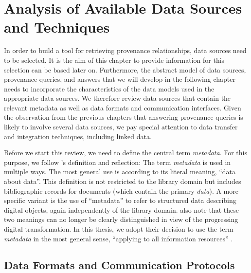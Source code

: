 \chapter{Analysis of Available Data Sources and Techniques}
\label{chap:analysis}

In order to build a tool for retrieving provenance relationships,
data sources need to be selected. It is the aim of this chapter
to provide information for this selection can be based later on.
Furthermore, the abstract model of data sources, provenance queries, and answers
that we will develop in the following chapter
needs to incorporate the characteristics of the data models used in the appropriate data sources.
We therefore review data sources that contain the relevant metadata
as well as data formats and communication interfaces.
Given the observation from the previous chapters
that answering provenance queries is likely to involve several data sources,
we pay special attention to data transfer and integration techniques,
including linked data.

Before we start this review, we need to define the central term \emph{metadata}.
For this purpose, we follow \citeauthor{Hider2008}'s \autocite*{Hider2008} definition and reflection:
The term \emph{metadata} is used in multiple ways.
The most general use is according to its literal meaning, \enquote{data about data}.
This definition is not restricted to the library domain
but includes bibliographic records for documents (which contain the primary \emph{data}).
A more specific variant is the use of \enquote{metadata} to refer to
structured data describing digital objects,
again independently of the library domain. \citeauthor{Hider2008} also note that
these two meanings can no longer be clearly distinguished in view of the
progressing digital transformation. In this thesis, we adopt their
decision to use the term \emph{metadata} in the most general sense,
\enquote{applying to all information resources} \autocite[p.13]{Hider2008}.


\section{Data Formats and Communication Protocols}
\label{sec:data_models}

